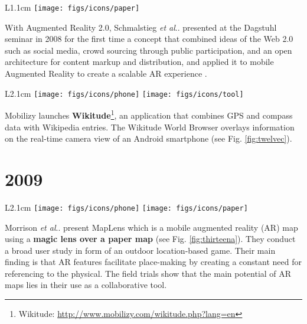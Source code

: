\documentclass[12pt,a4paper]{article}
\makeatletter
\DeclareRobustCommand\onedot{\futurelet\@let@token\@onedot}
\def\@onedot{\ifx\@let@token.\else.\null\fi\xspace}
\def\etal{\emph{et al}\onedot}
\makeatother
\begin{document}
\vspace{0.1in}

\begin{wrapfigure}{L}{1.1cm}
	\vspace{-10pt}	
	\texttt{[image: figs/icons/paper]}	
	\vspace{-10pt}		
\end{wrapfigure}
\noindent With Augmented Reality 2.0, Schmalstieg \etal presented at the Dagstuhl seminar in 2008 for the first time a concept that combined ideas of the Web 2.0 such as social media, crowd sourcing through public participation, and an open architecture for content markup and distribution, and applied it to mobile Augmented Reality to create a scalable AR experience \cite{Schmalstieg11}.

\newpage

\begin{wrapfigure}{L}{2.1cm}
	\vspace{-0pt}	
	\texttt{[image: figs/icons/phone]}
	\texttt{[image: figs/icons/tool]}	
	\vspace{-20pt}		
\end{wrapfigure}
\noindent Mobilizy launches \textbf{Wikitude}\footnote{Wikitude: \url{http://www.mobilizy.com/wikitude.php?lang=en}}, an application that combines GPS and compass data with Wikipedia entries. The Wikitude World Browser overlays information on the real-time camera view of an Android smartphone (see Fig. \ref{fig:twelvec}).

\vspace{-5pt} 
\section*{2009}

\begin{wrapfigure}{L}{2.1cm}
	\vspace{-15pt}	
	\texttt{[image: figs/icons/phone]}
	\texttt{[image: figs/icons/paper]}	
	\vspace{-25pt}		
\end{wrapfigure}
Morrison \etal present MapLens which is a mobile augmented reality (AR) map using a \textbf{magic lens over a paper map} \cite{Morrison09} (see Fig. \ref{fig:thirteena}). They conduct a broad user study in form of an outdoor location-based game. Their main finding is that AR features facilitate place-making by creating a constant need for referencing to the physical. The field trials show that the main potential of AR maps lies in their use as a collaborative tool.
\end{document}
